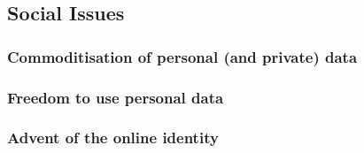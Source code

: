 \subsection{Social Issues}

\subsubsection{Commoditisation of personal (and private) data}

\subsubsection{Freedom to use personal data}

\subsubsection{Advent of the online identity}
